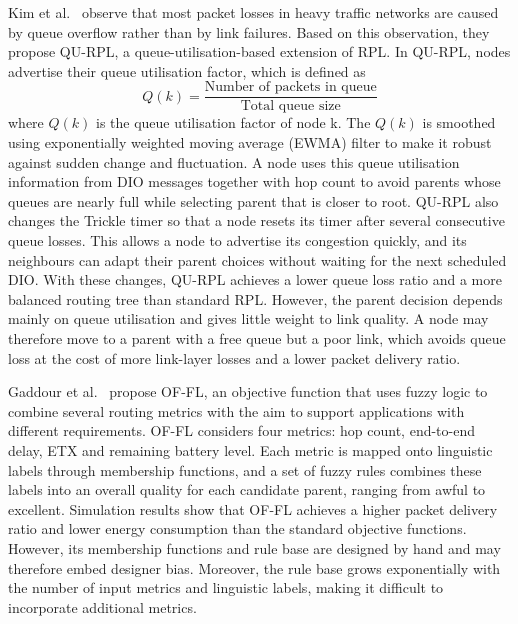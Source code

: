 Kim et al.~\cite{kimQURPLQueueUtilization2015} observe that most
packet losses in heavy traffic networks are caused by queue overflow
rather than by link failures. Based on this observation, they propose
QU-RPL, a queue-utilisation-based extension of RPL. In QU-RPL, nodes
advertise their queue utilisation factor, which is defined as
\begin{equation}
    Q(k) = \frac{\text{Number of packets in queue}}{\text{Total queue size}}
\end{equation}
where $Q(k)$ is the queue utilisation factor of node k. The $Q(k)$ is
smoothed using
exponentially weighted moving average (EWMA) filter to make it robust
against sudden change and fluctuation. A node uses
this queue utilisation information from DIO messages together with
hop count to avoid parents whose queues are nearly full while
selecting parent that is closer to root.
QU-RPL also changes the Trickle timer so that a node resets its timer
after several consecutive queue losses. This allows a node to
advertise its congestion quickly, and its neighbours can adapt their
parent choices without waiting for the next scheduled DIO. With these
changes, QU-RPL achieves a lower queue loss ratio and a more balanced
routing tree than standard RPL. However, the parent decision depends
mainly on queue utilisation and gives little weight to link quality.
A node may therefore move to a parent with a free queue but a poor
link, which avoids queue loss at the cost of more link-layer losses
and a lower packet delivery ratio.

Gaddour et al.~\cite{gaddourOFFLQoSawareFuzzy2014} propose OF-FL, an
objective function that uses fuzzy logic to combine several routing
metrics with the aim to support applications with different
requirements. OF-FL considers four metrics: hop count, end-to-end
delay, ETX and remaining battery level. Each metric is mapped onto
linguistic labels through membership functions, and a set of fuzzy
rules combines these labels into an overall quality for each
candidate parent, ranging from awful to excellent. Simulation results
show that OF-FL achieves a higher packet delivery ratio and lower
energy consumption than the standard objective functions.
However, its membership functions and rule base are designed by hand
and may therefore embed designer bias. Moreover, the rule base grows
exponentially with the number of input metrics and linguistic labels,
making it difficult to incorporate additional metrics.

